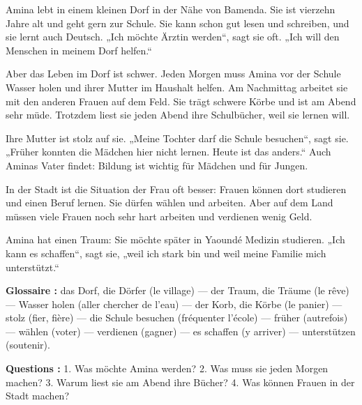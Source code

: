 \documentclass[11pt]{article}
\begin{document}
\begin{textebox}
Amina lebt in einem kleinen Dorf in der Nähe von Bamenda. Sie ist vierzehn Jahre alt und geht gern zur Schule. Sie kann schon gut lesen und schreiben, und sie lernt auch Deutsch. „Ich m\"ochte Ärztin werden“, sagt sie oft. „Ich will den Menschen in meinem Dorf helfen.“

Aber das Leben im Dorf ist schwer. Jeden Morgen muss Amina vor der Schule Wasser holen und ihrer Mutter im Haushalt helfen. Am Nachmittag arbeitet sie mit den anderen Frauen auf dem Feld. Sie tr\"agt schwere Körbe und ist am Abend sehr m\"ude. Trotzdem liest sie jeden Abend ihre Schulbücher, weil sie lernen will.

Ihre Mutter ist stolz auf sie. „Meine Tochter darf die Schule besuchen“, sagt sie. „Früher konnten die Mädchen hier nicht lernen. Heute ist das anders.“ Auch Aminas Vater findet: Bildung ist wichtig für Mädchen und für Jungen.

In der Stadt ist die Situation der Frau oft besser: Frauen können dort studieren und einen Beruf lernen. Sie dürfen wählen und arbeiten. Aber auf dem Land müssen viele Frauen noch sehr hart arbeiten und verdienen wenig Geld.

Amina hat einen Traum: Sie m\"ochte später in Yaoundé Medizin studieren. „Ich kann es schaffen“, sagt sie, „weil ich stark bin und weil meine Familie mich unterstützt.“

\textbf{Glossaire :} das Dorf, die Dörfer (le village) — der Traum, die Träume (le rêve) — Wasser holen (aller chercher de l'eau) — der Korb, die Körbe (le panier) — stolz (fier, fière) — die Schule besuchen (fréquenter l'école) — früher (autrefois) — wählen (voter) — verdienen (gagner) — es schaffen (y arriver) — unterstützen (soutenir).

\textbf{Questions :} 1. Was m\"ochte Amina werden? 2. Was muss sie jeden Morgen machen? 3. Warum liest sie am Abend ihre Bücher? 4. Was können Frauen in der Stadt machen?
\end{textebox}
\end{document}
